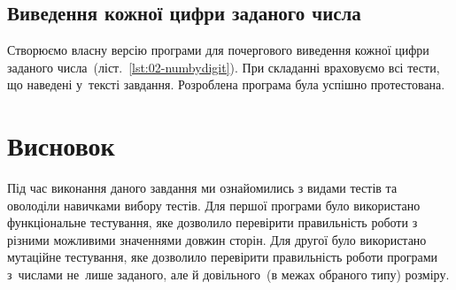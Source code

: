 \documentclass[a4paper,oneside,BCOR=1cm,DIV=12,12pt,headings=normal]{scrartcl}
\begin{document}
		\subsection{Виведення кожної цифри заданого числа}
			Створюємо власну версію програми для почергового виведення кожної цифри заданого числа~(ліст.~\ref{lst:02-numbydigit}). При складанні враховуємо всі тести, що наведені у~тексті завдання. Розроблена програма була успішно протестована.


	\section{Висновок}
		Під час виконання даного завдання ми ознайомились з видами тестів та оволоділи навичками вибору тестів. Для першої програми було використано функціональне тестування, яке дозволило перевірити правильність роботи з різними можливими значеннями довжин сторін. Для другої було використано мутаційне тестування, яке дозволило перевірити правильність роботи програми з~числами не~лише заданого, але й довільного~(в межах обраного типу) розміру.
\end{document}
